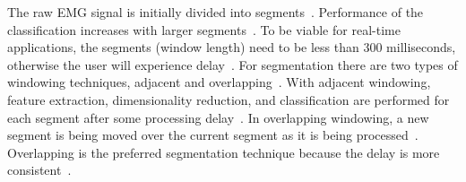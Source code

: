 \label{segmentation}
The raw EMG signal is initially divided into segments~\cite{nazmiReviewClassificationTechniques2016}. Performance of the classification increases with larger segments~\cite{phinyomarkEMGFeatureEvaluation2013}. To be viable for real-time applications, the segments (window length) need to be less than 300 milliseconds, otherwise the user will experience delay~\cite{phinyomarkEMGFeatureEvaluation2013}\cite{phinyomarkApplicationWaveletAnalysis2011}\cite{hristovClassificationIndividualCombined2022}. For segmentation there are two types of windowing techniques, adjacent and overlapping~\cite{nazmiReviewClassificationTechniques2016}. With adjacent windowing, feature extraction, dimensionality reduction, and classification are performed for each segment after some processing delay~\cite{nazmiReviewClassificationTechniques2016}. In overlapping windowing, a new segment is being moved over the current segment as it is being processed~\cite{nazmiReviewClassificationTechniques2016}.
Overlapping is the preferred segmentation technique because the delay is more consistent~\cite{khanSelectionFeaturesClassifiers2020}.

